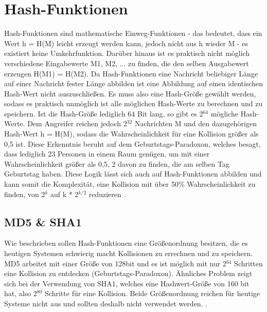 \documentclass[10pt, a4paper,headsepline]{scrreprt}
\begin{document}
\section{Hash-Funktionen}
Hash-Funktionen sind mathematische Einweg-Funktionen - das bedeutet, dass ein Wert h = H(M) leicht erzeugt werden kann, jedoch nicht aus h wieder M - es existiert keine Umkehrfunktion. Darüber hinaus ist es praktisch nicht möglich verschiedene Eingabewerte M1, M2, ... zu finden, die den selben Ausgabewert erzeugen H(M1) = H(M2). Da Hash-Funktionen eine Nachricht beliebiger Länge auf einer Nachricht fester Länge abbilden ist eine Abbildung auf einen identischen Hash-Wert nicht auszuschließen. Es muss also eine Hash-Größe gewählt werden, sodass es praktisch unmöglich ist alle möglichen Hash-Werte zu berechnen und zu speichern. Ist die Hash-Größe lediglich 64 Bit lang, so gibt es 2$^{64}$ mögliche Hash-Werte. Dem Angreifer reichen jedoch 2$^{32}$ Nachrichten M und den dazugehörigen Hash-Wert h = H(M), sodass die Wahrscheinlichkeit für eine Kollision größer als 0,5 ist. Diese Erkenntnis beruht auf dem Geburtstags-Paradoxon, welches besagt, dass lediglich 23 Personen in einem Raum genügen, um mit einer Wahrscheinlichkeit größer als 0,5, 2 davon zu finden, die am selben Tag Geburtstag haben. Diese Logik lässt sich auch auf Hash-Funktionen abbilden und kann somit die Komplexität, eine Kollision mit über 50\% Wahrscheinlichkeit zu finden, von 2$^{k}$ auf k * 2$^{k/2}$ reduzieren \cite[S. 375ff]{book:it-sicherheit}.

\subsection{MD5 \& SHA1}
Wie beschrieben sollen Hash-Funktionen eine Größenordnung besitzen, die es heutigen Systemen schwierig macht Kollisionen zu errechnen und zu speichern. MD5 arbeitet mit einer Größe von 128bit und es ist möglich mit nur 2$^{64}$ Schritten eine Kollision zu entdecken (Geburtstags-Paradoxon). Ähnliches Problem zeigt sich bei der Verwendung von SHA1, welches eine Hashwert-Größe von 160 bit hat, also 2$^{80}$ Schritte für eine Kollision. Beide Größenordnung reichen für heutige Systeme nicht aus und sollten deshalb nicht verwendet werden. \citep[S.382ff]{book:it-sicherheit} \citep[S. 84ff]{book:practical-crypto} \citep[S. 498ff, 504ff]{book:angewandte-krypto}.
\end{document}
